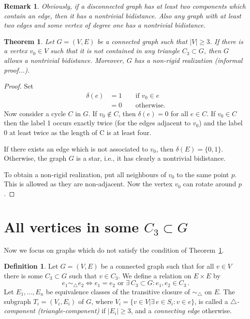 \documentclass[a4paper, 11pt]{article}
\newcommand{\trcomp}{$\triangle$-component}
\newtheorem{thm}{Theorem}[section]
\newtheorem*{rem}{Remark}
\theoremstyle{definition}
\newtheorem{defn}{Definition}[section]
\begin{document}
\begin{rem}
Obviously, if a disconnected graph has at least two components which contain an edge, then it has a nontrivial bidistance. Also any graph with at least two edges and some vertex of degree one has a nontrivial bidistance.
\end{rem}

\begin{thm}
\label{thm:vertexNotInTriangle}
Let $G=(V,E)$ be a connected graph such that $|V|\geq 3$. If there is a vertex $v_0 \in V$ such that it is not contained in any triangle $C_3\subset G$, then $G$ allows a nontrivial bidistance. Moreover, $G$ has a non-rigid realization (informal proof...).
\end{thm}
\begin{proof}
Set
\begin{align*}
\delta(e)&=1 \qquad \text{if } v_0 \in e \\
		&=0 \qquad \text{otherwise.}
\end{align*} 
Now consider a cycle $C$ in $G$. If $v_0\notin C$, then $\delta(e)=0$ for all $e\in C$. If $v_0\in C$ then the label 1 occurs exactly twice (for the edges adjacent to $v_0$) and the label 0 at least twice as the length of C is at least four.

If there exists an edge which is not associated to $v_0$, then $\delta(E)=\{0,1\}$. Otherwise, the graph $G$ is a star, i.e., it has clearly a nontrivial bidistance.

To obtain a non-rigid realization, put all neighbours of $v_0$ to the same point $p$. This is allowed as they are non-adjacent. Now the vertex $v_0$ can rotate around $p$.
\end{proof}

\section{All vertices in some $C_3\subset G$}
Now we focus on graphs which do not satisfy the condition of Theorem~\ref{thm:vertexNotInTriangle}.
 

\begin{defn}
Let $G=(V,E)$ be a connected graph such that for all $v\in V$ there is some $C_3\subset G$ such that $v\in C_3$. We define a relation on $E\times E$ by 
$$e_1 \sim_{\!\!\bigtriangleup} e_2 \iff e_1=e_2 \text{ or } \exists\, C_3\subset G: e_1, e_2\in C_3\,.$$
Let $E_1, \dots, E_n$ be equivalence classes of the transitive closure of $\sim_{\!\!\bigtriangleup}$ on $E$. The subgraph $T_i=(V_i,E_i)$ of $G$, where  $V_i=\{v\in V | \exists\, e\in S_i \colon v\in e\}$, is called a \emph{\trcomp{} (triangle-component)} if $|E_i|\geq 3$, and a \emph{connecting edge} otherwise.
\end{defn}
\end{document}
